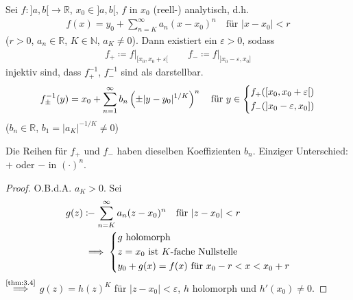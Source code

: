 \begin{theorem}[Satz]
  Sei $f : ]a,b[ \to \mathbb{R}$, $x_0 \in ]a,b[$, $f$ in $x_0$ (reell-) analytisch, d.h.
  \begin{align*}
    f(x) = y_0 + \sum\limits_{n=K}^{\infty} a_n (x-x_0)^n \quad \text{für } |x-x_0| < r
  \end{align*}
  ($r>0$, $a_n \in \mathbb{R}$, $K \in \mathbb{N}$, $a_K \neq 0$). Dann existiert ein $\varepsilon > 0$, sodass
  \begin{align*}
    f_{+} \coloneq f \Big|_{[x_0,x_0+\varepsilon[} \qquad f_{-} \coloneq f \Big|_{]x_0-\varepsilon,x_0]}
  \end{align*}
  injektiv sind, dass $f_{+}^{-1}$, $f_{-}^{-1}$ sind als  darstellbar.
  \begin{align*}
    f_{\pm}^{-1}(y) = x_0 + \sum\limits_{n=1}^{\infty} b_n \left( \pm |y-y_0|^{1/K} \right)^n
    \quad \text{für } y \in 
    \begin{dcases}
      f_{+}([x_0,x_0+\varepsilon[) \\
      f_{-}(]x_0-\varepsilon,x_0])
    \end{dcases}
  \end{align*}
  ($b_n \in \mathbb{R}$, $b_1 = |a_K|^{-1/K} \neq 0$)
  
  Die Reihen für $f_{+}$ und $f_{-}$ haben dieselben Koeffizienten $b_n$. Einziger Unterschied: $+$ oder $-$ in $(\cdot)^n$.
  
  \begin{proof} %
    O.B.d.A. $a_K > 0$. Sei
    \begin{align*}
      g(z) &\coloneq \sum\limits_{n=K}^{\infty} a_n (z-x_0)^n \quad \text{für } |z-x_0| < r \\
      &\implies
      \begin{dcases}
        g \text{ holomorph} \\
        z = x_0 \text{ ist $K$-fache Nullstelle} \\
        y_0 + g(x) = f(x) \text{ für } x_0 - r < x < x_0 + r
      \end{dcases}
    \end{align*}
    $\overset{\text{\ref{thm:3.4}}}{\implies}$ $g(z) = h(z)^K$ für $|z-x_0| < \varepsilon$, $h$ holomorph und $h'(x_0) \neq 0$.
    

\end{proof}
\end{theorem}
